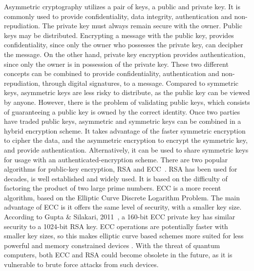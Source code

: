 Asymmetric cryptography utilizes a pair of keys, a public and private key. It is commonly used to provide confidentiality, data integrity, authentication and non-repudiation.
The private key must always remain secure with the owner. Public keys may be distributed. Encrypting a message with the public key, provides confidentiality, since only the owner who possesses the private key, can decipher the message. On the other hand, private key encryption provides authentication, since only the owner is in possession of the private key. These two different concepts can be combined to provide confidentiality, authentication and non-repudiation, through digital signatures, to a message.
Compared to symmetric keys, asymmetric keys are less risky to distribute, as the public key can be viewed by anyone. However, there is the problem of validating public keys, which consists of guaranteeing a public key is owned by the correct identity.
Once two parties have traded public keys, asymmetric and symmetric keys can be combined in a hybrid encryption scheme. It takes advantage of the faster symmetric encryption to cipher the data, and the asymmetric encryption to encrypt the symmetric key, and provide authentication. Alternatively, it can be used to share symmetric keys for usage with an authenticated-encryption scheme.
There are two popular algorithms for public-key encryption, \ac{RSA} and \ac{ECC}~\cite{mahto2016security}.
\ac{RSA} has been used for decades, is well established and widely used. It is based on the difficulty of factoring the product of two large prime numbers.
\ac{ECC} is a more recent algorithm, based on the Elliptic Curve Discrete Logarithm Problem. The main advantage of \ac{ECC} is it offers the same level of security, with a smaller key size. According to Gupta \& Silakari, 2011~\cite{eccoverrsa}, a 160-bit \ac{ECC} private key has similar security to a 1024-bit \ac{RSA} key.
\ac{ECC} operations are potentially faster with smaller key sizes, so this makes elliptic curve based schemes more suited for less powerful and memory constrained devices \cite{selvakumaraswamy2016efficient}.
With the threat of quantum computers, both \ac{ECC} and \ac{RSA} could become obsolete in the future, as it is vulnerable to brute force attacks from such devices.

